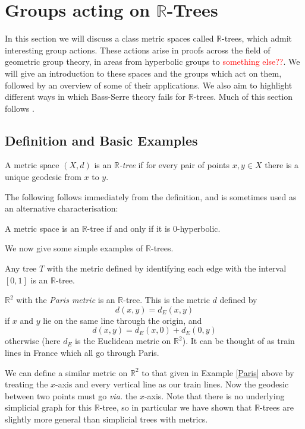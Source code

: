 \section{Groups acting on $\mathbb{R}$-Trees}

In this section we will discuss a class metric spaces called $\mathbb{R}$-trees, which admit interesting group actions. These actions arise in proofs across the field of geometric group theory, in areas from hyperbolic groups to \textcolor{red}{something else??}. We will give an introduction to these spaces and the groups which act on them, followed by an overview of some of their applications. We also aim to highlight different ways in which Bass-Serre theory fails for $\mathbb{R}$-trees. Much of this section follows \cite{Bestvina_trees}.
\subsection{Definition and Basic Examples}
\begin{definition}
    A metric space $(X,d)$ is an \emph{$\mathbb{R}$-tree} if for every pair of points $x,y\in X$ there is a unique geodesic from $x$ to $y$.
\end{definition}

The following follows immediately from the definition, and is sometimes used as an alternative characterisation:

\begin{proposition}
    A metric space is an $\mathbb{R}$-tree if and only if it is 0-hyperbolic.
\end{proposition}

We now give some simple examples of $\mathbb{R}$-trees.

\begin{example}
    Any tree $T$ with the metric defined by identifying each edge with the interval $[0,1]$ is an $\mathbb{R}$-tree.
\end{example}

\begin{example}\label{Paris}
    $\mathbb{R}^2$ with the \textit{Paris metric} is an $\mathbb{R}$-tree. This is the metric $d$ defined by\[d(x,y)=d_E(x,y)\]if $x$ and $y$ lie on the same line through the origin, and\[d(x,y)=d_E(x,0)+d_E(0,y)\] otherwise (here $d_E$ is the Euclidean metric on $\mathbb{R}^2$). It can be thought of as train lines in France which all go through Paris.
\end{example}

\begin{example}\label{xtrains}
    We can define a similar metric on $\mathbb{R}^2$ to that given in Example \ref{Paris} above by treating the $x$-axis and every vertical line as our train lines. Now the geodesic between two points must go \textit{via.} the $x$-axis. Note that there is no underlying simplicial graph for this $\mathbb{R}$-tree, so in particular we have shown that $\mathbb{R}$-trees are slightly more general than simplicial trees with metrics.
\end{example}

